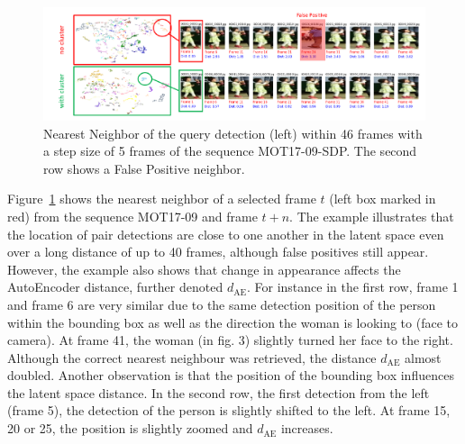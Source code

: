 \begin{figure}[t]
	\begin{center}
		\includegraphics[width=1.0\linewidth]{Fig_4_figure.pdf}
	\end{center}
	\caption{Nearest Neighbor of the query detection (left) within 46 frames with a step size of 5 frames of the sequence MOT17-09-SDP. The second row shows a False Positive neighbor. }
	\label{fig:figure3}
\end{figure}

Figure~\ref{fig:figure3} shows the nearest neighbor of a selected frame $t$ (left box marked in red) from the sequence MOT17-09 and frame $t+n$. 
The example illustrates that the location of pair detections are close to one another in the latent space even over a long distance of up to 40 frames, although false positives still appear. 
However, the example also shows that change in appearance affects the AutoEncoder distance, further denoted $d_{\mathrm{AE}}$. 
For instance in the first row, frame 1 and frame 6 are very similar due to the same detection position of the person within the bounding box as well as the direction the woman is looking to (face to camera). 
At frame 41, the woman (in fig. 3) slightly turned her face to the right. 
Although the correct nearest neighbour was retrieved, the distance $d_{\mathrm{AE}}$ almost doubled.
Another observation is that the position of the bounding box influences the latent space distance.
In the second row, the first detection from the left (frame 5), the detection of the person is slightly shifted to the left. 
At frame 15, 20 or 25, the position is slightly zoomed and $d_{\mathrm{AE}}$ increases.

